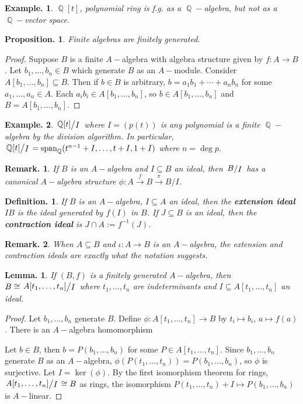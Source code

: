 \documentclass[11pt, a4paper]{memoir}
\DeclareMathOperator{\Q}{{\mathbb{Q}}}
\newcommand{\fto}[1]{\ensuremath{\xrightarrow{\scriptstyle{#1}}}}
\theoremstyle{change}
\newtheorem{lemma}[theorem]{Lemma.}
\newtheorem{proposition}[theorem]{Proposition.}
\theoremstyle{plain}
\theoremstyle{nonumberplain}
\newtheorem{definition}{Definition.}
\newtheorem{example}{Example.}
\newtheorem{remark}{Remark.}
\newtheorem{proof}{Proof}
\DeclareMathOperator{\spn}{span}
\newcommand{\quot}[2]{\mathchoice{\left.\raisebox{0.12em}{$#1$}\middle/\raisebox{-0.12em}{$#2$}\right.}
                                 {\left.\raisebox{0.06em}{$#1$}\middle/\raisebox{-0.06em}{$#2$}\right.}
                                 {\left.\raisebox{0.02em}{$#1$}\middle/\raisebox{-0.02em}{$#2$}\right.}
                                 {\left.\raisebox{0em}{$#1$}\middle/\raisebox{0em}{$#2$}\right.}}
\numberwithin{equation}{section}
\begin{document}
\begin{example}
    $\Q[t]$, polynomial ring is f.g. as a $\Q-$algebra, but not as a $\Q-$vector space.
\end{example}

\begin{proposition}
    Finite algebras are finitely generated.
\end{proposition}
\begin{proof}
    Suppose $B$ is a finite $A-$algebra with algebra structure given by $f:A\to B$.
    Let $b_1,\ldots,b_n\in B$ which generate $B$ as an $A-$module.
    Consider $A[b_1,\ldots,b_n]\subseteq B$.
    Then if $b\in B$ is arbitrary, $b=a_1b_1+\cdots+a_nb_n$ for some $a_1,\ldots,a_n\in A$.
    Each $a_ib_i\in A[b_1,\ldots,b_n]$, so $b\in A[b_1,\ldots,b_n]$ and $B=A[b_1,\ldots,b_n]$.
\end{proof}
\begin{example}
    $\quot{\Q[t]}{I}$ where $I=(p(t))$ is any polynomial is a finite $\Q-$algebra by the division algorithm.
    In particular, $\quot{\Q[t]}{I}=\spn_{\Q}(t^{n-1}+I,\ldots,t+I,1+I)$ where $n=\deg p$.
\end{example}
\begin{remark}
    If $B$ is an $A-$algebra and $I\subseteq B$ an ideal, then $\quot{B}{I}$ has a canonical $A-$algebra structure $\phi:A\fto{f} B\fto{\pi} B/I$.
\end{remark}
\begin{definition}
    If $B$ is an $A-$algebra, $I\subseteq A$ an ideal, then the \textbf{extension ideal} $IB$ is the ideal generated by $f(I)$ in $B$.
    If $J\subseteq B$ is an ideal, then the \textbf{contraction ideal} is $J\cap A:=f^{-1}(J)$.
\end{definition}
\begin{remark}
    When $A\subseteq B$ and $\iota:A\to B$ is an $A-$algebra, the extension and contraction ideals are exactly what the notation suggests.
\end{remark}
\begin{lemma}
    If $(B,f)$ is a finitely generated $A-$algebra, then $B\cong\quot{A[t_1,\ldots,t_n]}{I}$ where $t_1,\ldots,t_n$ are indeterminants and $I\subseteq A[t_1,\ldots,t_n]$ an ideal.
\end{lemma}
\begin{proof}
    Let $b_1,\ldots,b_n$ generate $B$.
    Define $\phi:A[t_1,\ldots,t_n]\to B$ by $t_i\mapsto b_i$, $a\mapsto f(a)$.
    There is an $A-$algebra homomorphism
    \begin{center}
    \end{center}
    Let $b\in B$, then $b=P(b_1,\ldots,b_n)$ for some $P\in A[t_1,\ldots,t_n]$.
    Since $b_1,\ldots,b_n$ generate $B$ as an $A-$algebra, $\phi(P(t_1,\ldots,t_n))=P(b_1,\ldots,b_n)$, so $\phi$ is surjective.
    Let $I=\ker(\phi)$.
    By the first isomorphism theorem for rings, $\quot{A[t_1,\ldots,t_n]}{I}\cong B$ as rings, the isomorphism $P(t_1,\ldots,t_n)+I\mapsto P(b_1,\ldots,b_n)$ is $A-$linear.
\end{proof}
\end{document}
